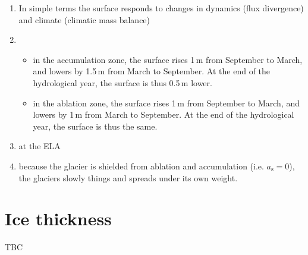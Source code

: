 \documentclass[DIV15,11pt,parskip=half]{scrartcl}
\begin{document}
\begin{enumerate}
\item In simple terms the surface responds to changes in dynamics (flux divergence) and climate (climatic mass balance)
\item
\begin{itemize}
\item in the accumulation zone, the surface rises 1\,m from September to March, and lowers by 1.5\,m from March to September. At the end of the hydrological year, the surface is thus 0.5\,m lower.
\item in the ablation zone, the surface rises 1\,m from September to March, and lowers by 1\,m from March to September. At the end of the hydrological year, the surface is thus the same.
\end{itemize}
\item at the ELA
\item because the glacier is shielded from ablation and accumulation (i.e. $a_{\textrm{s}} =0$), the glaciers slowly things and spreads under its own weight.
\end{enumerate}

\section{Ice thickness}

TBC
\end{document}
